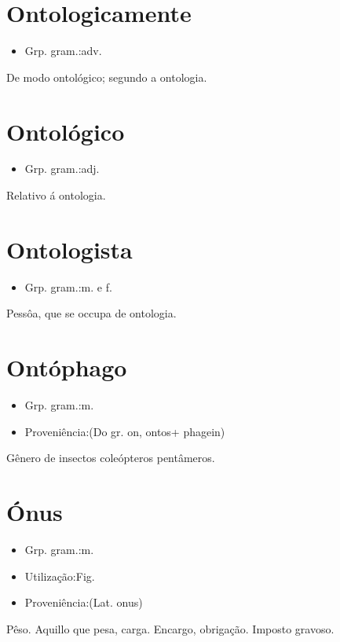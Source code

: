 \section{Ontologicamente}
\begin{itemize}
\item {Grp. gram.:adv.}
\end{itemize}
De modo ontológico; segundo a ontologia.
\section{Ontológico}
\begin{itemize}
\item {Grp. gram.:adj.}
\end{itemize}
Relativo á ontologia.
\section{Ontologista}
\begin{itemize}
\item {Grp. gram.:m.  e  f.}
\end{itemize}
Pessôa, que se occupa de ontologia.
\section{Ontóphago}
\begin{itemize}
\item {Grp. gram.:m.}
\end{itemize}
\begin{itemize}
\item {Proveniência:(Do gr. \textunderscore on\textunderscore , \textunderscore ontos\textunderscore  + \textunderscore phagein\textunderscore )}
\end{itemize}
Gênero de insectos coleópteros pentâmeros.
\section{Ónus}
\begin{itemize}
\item {Grp. gram.:m.}
\end{itemize}
\begin{itemize}
\item {Utilização:Fig.}
\end{itemize}
\begin{itemize}
\item {Proveniência:(Lat. \textunderscore onus\textunderscore )}
\end{itemize}
Pêso.
Aquillo que pesa, carga.
Encargo, obrigação.
Imposto gravoso.
